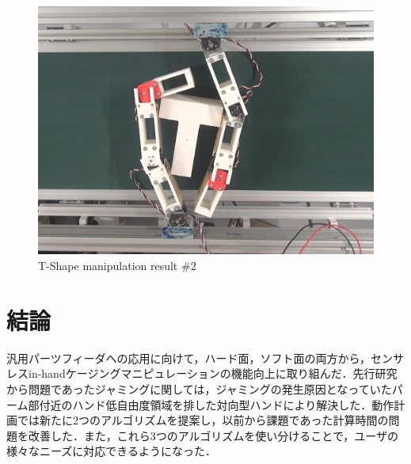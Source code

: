 \documentclass[a4paper,papersize,dvipdfmx]{mtabst}
\begin{document}
\begin{figure}[t]
\begin{minipage}{0.249\linewidth}
\end{minipage}\hfill
\begin{minipage}{0.249\linewidth}
\centering
\includegraphics[width=0.9\linewidth]{fig/4-manipulation-result/TShape/2-4.jpg}
\end{minipage}
\caption{T-Shape manipulation result \#2}\label{fig::tm2}
\end{figure}


\section{結論}
汎用パーツフィーダへの応用に向けて，ハード面，ソフト面の両方から，センサレスin-handケージングマニピュレーションの機能向上に取り組んだ．先行研究から問題であったジャミングに関しては，ジャミングの発生原因となっていたパーム部付近のハンド低自由度領域を排した対向型ハンドにより解決した．動作計画では新たに2つのアルゴリズムを提案し，以前から課題であった計算時間の問題を改善した．また，これら3つのアルゴリズムを使い分けることで，ユーザの様々なニーズに対応できるようになった．
\end{document}
